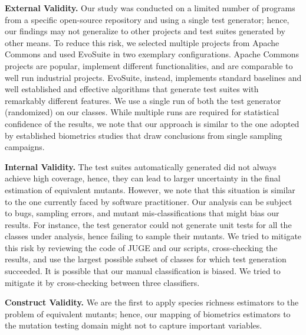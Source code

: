 \documentclass[sigconf,review,anonymous]{acmart}
\begin{document}
\noindent\textbf{External Validity.}
Our study was conducted on a limited number of programs from a specific
open-source repository and using a single test generator; hence, our findings
may not generalize to other projects and test suites generated by other means.
%
To reduce this risk, we selected multiple projects from Apache Commons and
used EvoSuite in two exemplary configurations.
%
Apache Commons projects are popular, implement different functionalities, and
are comparable to %
well run industrial projects.
EvoSuite, instead, implements standard baselines %
and
well established and effective algorithms %
that generate test suites with remarkably different features.
We use a single run of both the test generator (randomized) on our classes.
%
While multiple runs are required for statistical confidence of the results,
we note that our approach is similar to the one adopted by established biometrics
studies that draw conclusions from single sampling campaigns.

\noindent\textbf{Internal Validity.}
The test suites automatically generated did not always achieve high coverage, 
hence, they can lead to larger uncertainty in the final estimation of equivalent mutants. 
However, we note that this situation is similar to the one currently faced by software practitioner. %
%
Our analysis can be subject to bugs, sampling errors, and mutant mis-classifications
that might bias our results.
%
For instance, the test generator could not generate unit tests for all the classes under analysis,
hence failing to sample their mutants.
We tried to mitigate this risk by reviewing the code of JUGE and our scripts, 
cross-checking the results, and use the largest possible subset of classes for which
test generation succeeded.
It is possible that our manual classification is biased. We tried to mitigate it by cross-checking between three classifiers.

\noindent\textbf{Construct Validity.} We are the first to apply
species richness estimators to the problem of equivalent mutants; hence, 
our mapping of biometrics estimators to the mutation testing domain
might not to capture important variables. %
%
\end{document}

